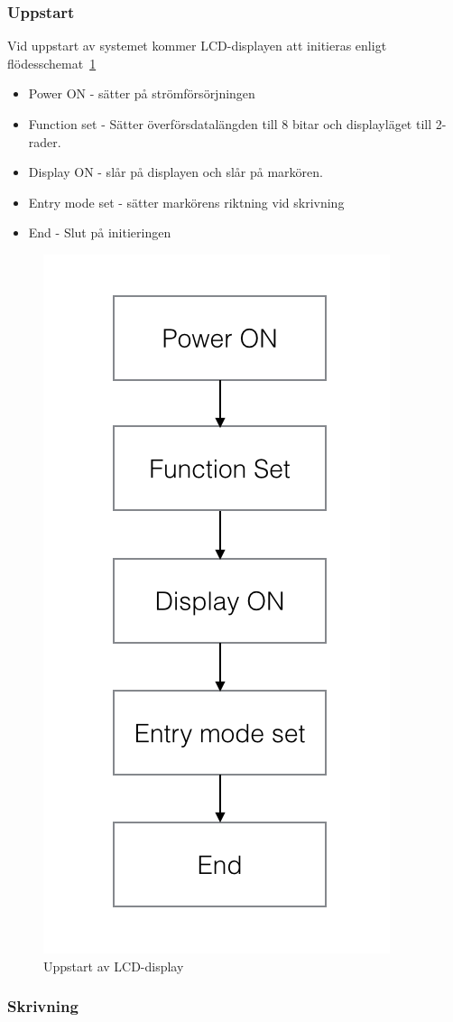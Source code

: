 \documentclass[a4paper,12pt,fleqn]{article}
\begin{document}
\subsubsection{Uppstart}
	
Vid uppstart av systemet kommer LCD-displayen att initieras enligt flödes\-schemat~\ref{fig:flowlcdstart}

\begin{itemize}
  \item Power ON - sätter på strömförsörjningen
  \item Function set - Sätter överförsdatalängden till 8 bitar och displayläget till 2-rader.
  \item Display ON - slår på displayen och slår på markören. 
  \item Entry mode set - sätter markörens riktning vid skrivning
  \item End - Slut på initieringen
\end{itemize}

\begin{figure}[htp]
	  \begin{center}
	  \includegraphics[keepaspectratio=true,width=0.4\linewidth]{bilder/startup}  %
	  \end{center}
	  \caption{Uppstart av LCD-display} %
	  \label{fig:flowlcdstart}
	\end{figure}

\newpage


\subsubsection{Skrivning}
\end{document}
